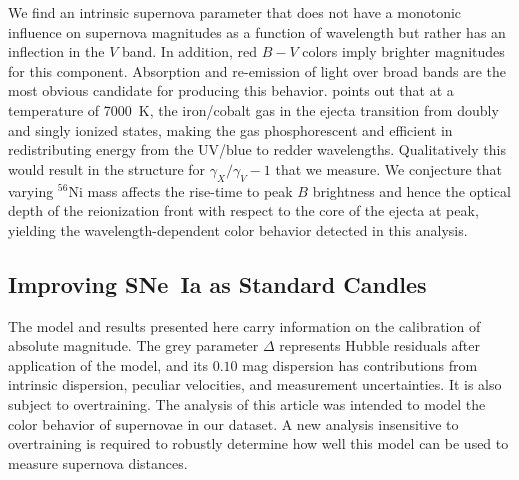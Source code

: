\documentclass{aastex61}   	%
\begin{document}
We find an intrinsic supernova parameter that does not have a monotonic influence on supernova magnitudes as a function
of wavelength but rather has an inflection in the $V$ band.  In addition, red $B-V$ colors imply brighter magnitudes
for this component.  Absorption and re-emission of light
over broad bands are the most obvious candidate for producing this behavior.
\citet{2006ApJ...649..939K} points out that at a temperature of 7000~K, the iron/cobalt gas in the ejecta transition
from doubly and singly ionized states, making the gas phosphorescent and efficient in redistributing energy from the UV/blue to redder
wavelengths.  Qualitatively this would result in the structure for $\gamma_X/\gamma_V-1$ that we measure.
We conjecture that varying $^{56}$Ni mass affects the rise-time to peak $B$ brightness and hence the optical depth
of the reionization front with respect to the core of the ejecta at peak, yielding the wavelength-dependent color behavior
detected in this analysis.

\subsection{Improving SNe~Ia as Standard Candles}
The model and results presented here
carry information on the calibration of absolute magnitude.  The grey parameter $\Delta$ represents Hubble residuals after
application of the model, and its  $0.10$ mag dispersion has contributions from intrinsic dispersion, peculiar velocities, and
measurement uncertainties.  It is also subject to overtraining.
The  analysis of this article was intended to model the color behavior of supernovae in our dataset.
\color{red}
A new analysis insensitive to overtraining is required to robustly determine how
well this model can be used to measure supernova distances.
\color{black}
\end{document}
